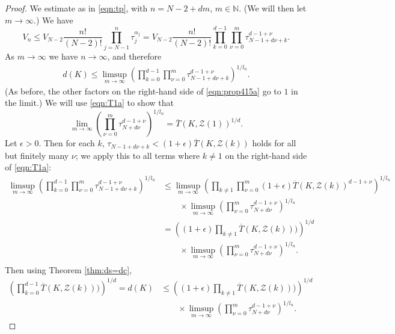 \documentclass[10pt,a4paper]{amsart}
\newcommand{\N}{\mathbb{N}}
\newcommand{\calZ}{\mathcal{Z}}
\begin{document}
\begin{proof}
We estimate as in \eqref{eqn:tp}, with $n=N-2 +dm$, $m\in\N$. (We will then let $m\to\infty$.)  We have 
\begin{equation}\label{eqn:prop415a}
V_n \leq V_{N-2}\frac{n!}{(N-2)!}\prod_{j=N-1}^n \tau_j^{\alpha_j}  = V_{N-2}\frac{n!}{(N-2)!} \prod_{k=0}^{d-1}\prod_{\nu=0}^m \tau_{N-1+d\nu+k}^{d-1+\nu}.
\end{equation}
 As $m\to\infty$ we have  $n\to\infty$, and therefore 
\begin{equation}\label{eqn:T1a}
\begin{aligned}
d(K)  \leq   \limsup_{m\to\infty}\left(\prod_{k=0}^{d-1}\prod_{\nu=0}^m \tau_{N-1+d\nu+k}^{d-1+\nu} \right)^{1/l_n}. 
\end{aligned}\end{equation}
(As before, the other factors on the right-hand side of \eqref{eqn:prop415a} go to $1$ in the limit.)  We will use \eqref{eqn:T1a} to show that
\begin{equation}\label{eqn:T1b}
\lim_{m\to\infty}\left(\prod_{\nu=0}^m \tau_{N+d\nu}^{d-1+\nu}\right)^{1/l_n} = \overline T(K,\calZ(1))^{1/d}.
\end{equation}
Let $\epsilon>0$.  Then for each $k$, $\tau_{N-1+d\nu+k}<(1+\epsilon)\overline T(K,\calZ(k))$ holds for all but finitely many $\nu$; we apply this to all terms where $k\neq 1$ on the right-hand side of \eqref{eqn:T1a}: 
$$\begin{aligned}
\limsup_{m\to\infty}\left(\prod_{k=0}^{d-1}\prod_{\nu=0}^m \tau_{N-1+d\nu+k}^{d-1+\nu} \right)^{1/l_n}
  & \leq \limsup_{m\to\infty}\left(\prod_{k\neq 1}\prod_{\nu=0}^m (1+\epsilon)\overline T(K,\calZ(k))^{d-1+\nu} \right)^{1/l_n} \\
& \qquad \times \limsup_{m\to\infty}\left(\prod_{\nu=0}^m \tau_{N+d\nu}^{d-1+\nu} \right)^{1/l_n} \\
& = \left((1+\epsilon)\prod_{k\neq 1} \overline T(K,\calZ(k)))\right)^{1/d} \\
&\qquad \times \limsup_{m\to\infty}\left(\prod_{\nu=0}^m \tau_{N+d\nu}^{d-1+\nu} \right)^{1/l_n}. \\
\end{aligned}$$ 
Then using Theorem \ref{thm:ds=dc}, 
$$\begin{aligned}
\left(\prod_{k=0}^{d-1} \overline T(K,\calZ(k)))\right)^{1/d}  =d(K)
& \leq \left((1+\epsilon)\prod_{k\neq 1} \overline T(K,\calZ(k)))\right)^{1/d} \\ 
&\qquad \times \limsup_{m\to\infty}\left(\prod_{\nu=0}^m \tau_{N+d\nu}^{d-1+\nu} \right)^{1/l_n}. 

\end{aligned}$$
\end{proof}
\end{document}
